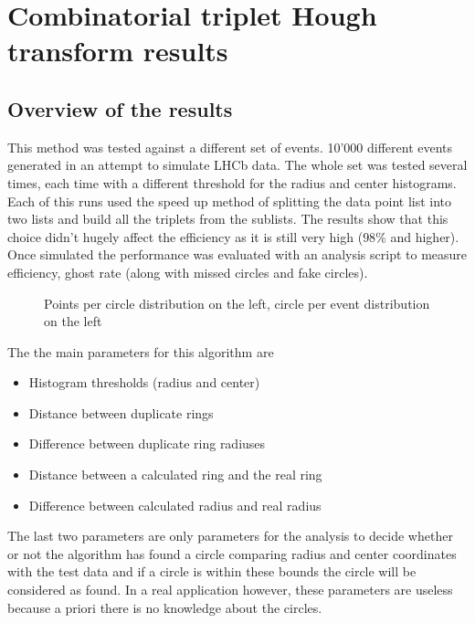 \documentclass[11pt,twoside]{scrreprt}
\begin{document}


\section{Combinatorial triplet Hough transform results} %
\label{sec:combinatorial_approach_results}

\subsection{Overview of the results} %
\label{sub:overview_of_the_results}

This method was tested against a different set of events. 10'000 different events generated in an attempt to simulate LHCb data. 
The whole set was tested several times, each time with a different threshold for the radius and center histograms. 
Each of this runs used the speed up method of splitting the data point list into two lists and build all the triplets from 
the sublists. The results show that this choice didn't hugely affect the efficiency as it is still very high ($98\%$ and higher). 
Once simulated the performance was evaluated with an analysis script to measure efficiency, ghost rate (along with missed 
circles and fake circles).

\begin{figure}[ht]
  \centering
  \caption{Points per circle distribution on the left, circle per event distribution on the left}
  \label{comb:ppc_cpe}
\end{figure}

The the main parameters for this algorithm are
\begin{itemize}
  \item Histogram thresholds (radius and center)
  \item Distance between duplicate rings
  \item Difference between duplicate ring radiuses
  \item Distance between a calculated ring and the real ring
  \item Difference between calculated radius and real radius
\end{itemize}
The last two parameters are only parameters for the analysis to decide whether or not the algorithm has found a circle comparing radius
and center coordinates with the test data and if a circle is within these bounds the circle will be considered as found. In a real application
however, these parameters are useless because a priori there is no knowledge about the circles.
\end{document}
